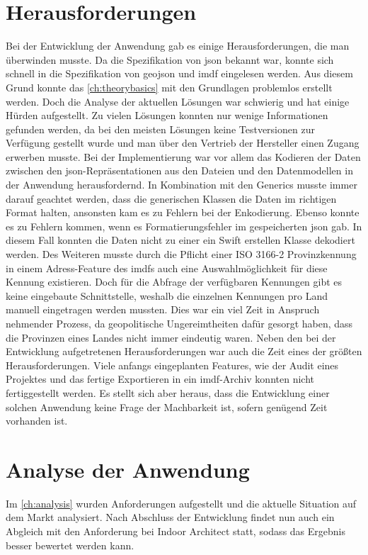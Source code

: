 \section{Herausforderungen}
Bei der Entwicklung der Anwendung gab es einige Herausforderungen, die man überwinden musste.
Da die Spezifikation von \ac{json} bekannt war, konnte sich schnell in die Spezifikation von \ac{geojson} und \ac{imdf} eingelesen werden.
Aus diesem Grund konnte das \autoref{ch:theorybasics} mit den Grundlagen problemlos erstellt werden.
Doch die Analyse der aktuellen Lösungen war schwierig und hat einige Hürden aufgestellt.
Zu vielen Lösungen konnten nur wenige Informationen gefunden werden, da bei den meisten Lösungen keine Testversionen zur Verfügung gestellt wurde und man über den Vertrieb der Hersteller einen Zugang erwerben musste.\pbreak%
%
Bei der Implementierung war vor allem das Kodieren der Daten zwischen den \ac{json}-Repräsentationen aus den Dateien und den Datenmodellen in der Anwendung herausfordernd.
In Kombination mit den Generics musste immer darauf geachtet werden, dass die generischen Klassen die Daten im richtigen Format halten, ansonsten kam es zu Fehlern bei der Enkodierung.
Ebenso konnte es zu Fehlern kommen, wenn es Formatierungsfehler im gespeicherten \ac{json} gab.
In diesem Fall konnten die Daten nicht zu einer ein Swift erstellen Klasse dekodiert werden.
Des Weiteren musste durch die Pflicht einer ISO 3166-2 Provinzkennung in einem Adress-Feature des \acl{imdf}s auch eine Auswahlmöglichkeit für diese Kennung existieren.
Doch für die Abfrage der verfügbaren Kennungen gibt es keine eingebaute Schnittstelle, weshalb die einzelnen Kennungen pro Land manuell eingetragen werden mussten.
Dies war ein viel Zeit in Anspruch nehmender Prozess, da geopolitische Ungereimtheiten dafür gesorgt haben, dass die Provinzen eines Landes nicht immer eindeutig waren.\pbreak%
%
Neben den bei der Entwicklung aufgetretenen Herausforderungen war auch die Zeit eines der größten Herausforderungen.
Viele anfangs eingeplanten Features, wie der Audit eines Projektes und das fertige Exportieren in ein \ac{imdf}-Archiv konnten nicht fertiggestellt werden.
Es stellt sich aber heraus, dass die Entwicklung einer solchen Anwendung keine Frage der Machbarkeit ist, sofern genügend Zeit vorhanden ist.

\section{Analyse der Anwendung}
Im \autoref{ch:analysis} wurden Anforderungen aufgestellt und die aktuelle Situation auf dem Markt analysiert.
Nach Abschluss der Entwicklung findet nun auch ein Abgleich mit den Anforderung bei Indoor Architect statt, sodass das Ergebnis besser bewertet werden kann.

